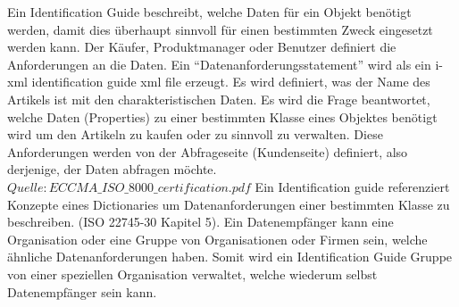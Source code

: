 Ein Identification Guide beschreibt, welche Daten für ein Objekt benötigt werden, damit dies überhaupt sinnvoll für einen bestimmten Zweck eingesetzt werden kann. Der Käufer, Produktmanager oder Benutzer definiert die Anforderungen an die Daten. Ein  \enquote{Datenanforderungsstatement} wird als ein i-xml identification guide xml file erzeugt. Es wird definiert, was der Name des Artikels ist mit den charakteristischen Daten. Es wird die Frage beantwortet, welche Daten (Properties) zu einer bestimmten Klasse eines Objektes benötigt wird um den Artikeln zu kaufen oder zu sinnvoll zu verwalten. Diese Anforderungen werden von der Abfrageseite (Kundenseite) definiert, also derjenige, der Daten abfragen möchte. \(Quelle: ECCMA\_ISO\_8000\_certification.pdf\)
Ein Identification guide referenziert Konzepte eines Dictionaries um Datenanforderungen einer bestimmten Klasse zu beschreiben. (ISO 22745-30 Kapitel 5). 
Ein Datenempfänger kann eine Organisation oder eine Gruppe von Organisationen oder Firmen sein, welche ähnliche Datenanforderungen haben. Somit wird ein Identification Guide Gruppe von einer speziellen Organisation verwaltet, welche wiederum selbst Datenempfänger sein kann.  

